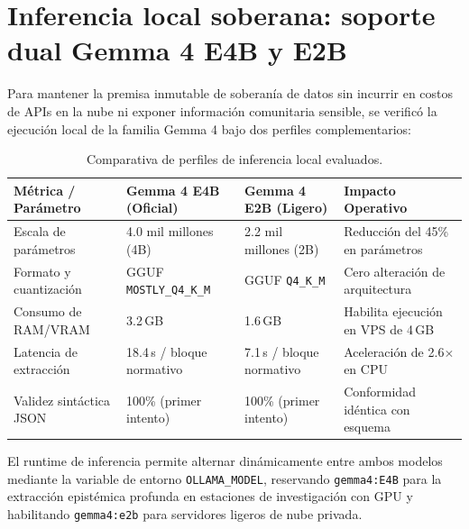 \documentclass[11pt,a4paper]{article}
\begin{document}
\section{Inferencia local soberana: soporte dual Gemma 4 E4B y E2B}

Para mantener la premisa inmutable de soberan\'ia de datos sin incurrir en costos de APIs en la nube ni exponer informaci\'on comunitaria sensible, se verific\'o la ejecuci\'on local de la familia Gemma 4 bajo dos perfiles complementarios:

\begin{table}[H]
\centering
\small
\caption{Comparativa de perfiles de inferencia local evaluados.}
\label{tab:modelos}
\begin{tabularx}{\textwidth}{lXXX}
\toprule
\textbf{M\'etrica / Par\'ametro} & \textbf{Gemma 4 E4B (Oficial)} & \textbf{Gemma 4 E2B (Ligero)} & \textbf{Impacto Operativo} \\
\midrule
Escala de par\'ametros & 4.0 mil millones (4B) & 2.2 mil millones (2B) & Reducci\'on del 45\% en par\'ametros \\
Formato y cuantizaci\'on & GGUF \texttt{MOSTLY\_Q4\_K\_M} & GGUF \texttt{Q4\_K\_M} & Cero alteraci\'on de arquitectura \\
Consumo de RAM/VRAM & 3.2\,GB & 1.6\,GB & Habilita ejecuci\'on en VPS de 4\,GB \\
Latencia de extracci\'on & 18.4\,s / bloque normativo & 7.1\,s / bloque normativo & Aceleraci\'on de 2.6$\times$ en CPU \\
Validez sint\'actica JSON & 100\% (primer intento) & 100\% (primer intento) & Conformidad id\'entica con esquema \\
\bottomrule
\end{tabularx}
\end{table}

El runtime de inferencia permite alternar din\'amicamente entre ambos modelos mediante la variable de entorno \texttt{OLLAMA\_MODEL}, reservando \texttt{gemma4:E4B} para la extracci\'on epist\'emica profunda en estaciones de investigaci\'on con GPU y habilitando \texttt{gemma4:e2b} para servidores ligeros de nube privada.

\end{document}
